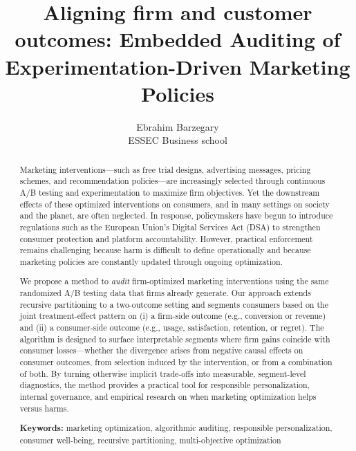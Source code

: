 \documentclass[11pt,letterpaper,english]{article}
\theoremstyle{definition}
\theoremstyle{definition}
\begin{document}
\title{Aligning firm and customer outcomes: Embedded Auditing of Experimentation-Driven Marketing Policies}


\author{
       Ebrahim Barzegary \\ %
        ESSEC Business school\\
 }

\thispagestyle{empty}

\date{}
\maketitle

\begin{abstract} 

Marketing interventions—such as free trial designs, advertising messages, pricing schemes, and recommendation policies—are increasingly selected through continuous A/B testing and experimentation to maximize firm objectives. Yet the downstream effects of these optimized interventions on consumers, and in many settings on society and the planet, are often neglected. In response, policymakers have begun to introduce regulations such as the European Union’s Digital Services Act (DSA) to strengthen consumer protection and platform accountability. However, practical enforcement remains challenging because harm is difficult to define operationally and because marketing policies are constantly updated through ongoing optimization.

We propose a method to \emph{audit} firm-optimized marketing interventions using the same randomized A/B testing data that firms already generate. Our approach extends recursive partitioning to a two-outcome setting and segments consumers based on the joint treatment-effect pattern on (i) a firm-side outcome (e.g., conversion or revenue) and (ii) a consumer-side outcome (e.g., usage, satisfaction, retention, or regret). The algorithm is designed to surface interpretable segments where firm gains coincide with consumer losses—whether the divergence arises from negative causal effects on consumer outcomes, from selection induced by the intervention, or from a combination of both. By turning otherwise implicit trade-offs into measurable, segment-level diagnostics, the method provides a practical tool for responsible personalization, internal governance, and empirical research on when marketing optimization helps versus harms.



\vspace{5mm}

\noindent \textbf{Keywords:} marketing optimization, algorithmic auditing, responsible personalization, consumer well-being, recursive partitioning, multi-objective optimization 

\end{abstract}
\end{document}

